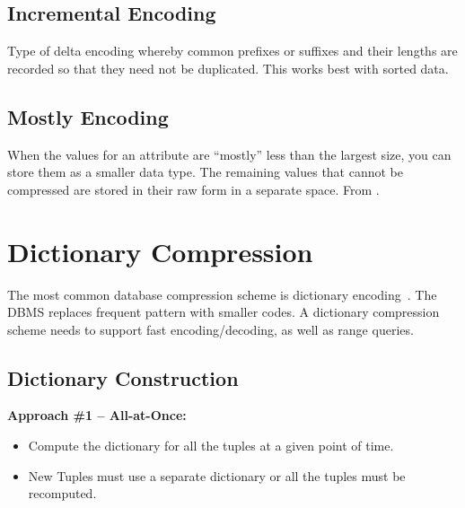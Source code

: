 \documentclass[11pt]{article}
\begin{document}
\subsection{Incremental Encoding}
Type of delta encoding whereby common prefixes or suffixes and their lengths are recorded 
so that they need not be duplicated. This works best with sorted data.

\subsection{Mostly Encoding}
When the values for an attribute are ``mostly'' less than the largest size, you can store 
them as a smaller data type.
The remaining values that cannot be compressed are stored in their raw form in a separate 
space.
From .

\section{Dictionary Compression}
The most common database compression scheme is dictionary encoding~\cite{p283-binnig}.
The DBMS replaces frequent pattern with smaller codes.
A dictionary compression scheme needs to support fast encoding/decoding, as well as range queries.

\subsection{Dictionary Construction}

\textbf{Approach \#1 -- All-at-Once:}
\begin{itemize}
    \item
    Compute the dictionary for all the tuples at a given point of time.
    
    \item
    New Tuples must use a separate dictionary or all the tuples must be recomputed.
\end{itemize}
\end{document}
